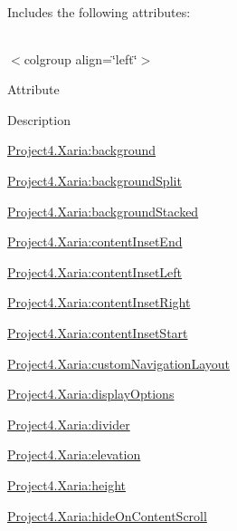 Includes the following attributes\+:

\tabulinesep=1mm
\begin{longtabu} spread 0pt [c]{*{0}{|X[-1]}|}
\hline
\end{longtabu}
$<$colgroup align=\char`\"{}left\char`\"{}$>$ 

Attribute

Description 

{\ttfamily \hyperlink{classproject4_1_1xaria_1_1R_1_1styleable_ad5297d7335b655c3a7281371b07c92d4}{Project4.\+Xaria\+:background}}

{\ttfamily \hyperlink{classproject4_1_1xaria_1_1R_1_1styleable_a0a05b0d40453638b3b59df9b162097ec}{Project4.\+Xaria\+:background\+Split}}

{\ttfamily \hyperlink{classproject4_1_1xaria_1_1R_1_1styleable_aff562ad353237ec535896356fc27af79}{Project4.\+Xaria\+:background\+Stacked}}

{\ttfamily \hyperlink{classproject4_1_1xaria_1_1R_1_1styleable_a89330126d297ac16f0e2a9dcfeaad358}{Project4.\+Xaria\+:content\+Inset\+End}}

{\ttfamily \hyperlink{classproject4_1_1xaria_1_1R_1_1styleable_a1b56e7090c35d8a347e0df70c0835624}{Project4.\+Xaria\+:content\+Inset\+Left}}

{\ttfamily \hyperlink{classproject4_1_1xaria_1_1R_1_1styleable_a214d077d9e00a3988b431a70cd90e71e}{Project4.\+Xaria\+:content\+Inset\+Right}}

{\ttfamily \hyperlink{classproject4_1_1xaria_1_1R_1_1styleable_a9212bf97d9d5252fd23d430335413682}{Project4.\+Xaria\+:content\+Inset\+Start}}

{\ttfamily \hyperlink{classproject4_1_1xaria_1_1R_1_1styleable_aa80da3fcac263c12efd759fb11979cc7}{Project4.\+Xaria\+:custom\+Navigation\+Layout}}

{\ttfamily \hyperlink{classproject4_1_1xaria_1_1R_1_1styleable_a656add89aebf98d754b0482202026647}{Project4.\+Xaria\+:display\+Options}}

{\ttfamily \hyperlink{classproject4_1_1xaria_1_1R_1_1styleable_aa7f5948a8f73f6442f4be22fae96c835}{Project4.\+Xaria\+:divider}}

{\ttfamily \hyperlink{classproject4_1_1xaria_1_1R_1_1styleable_a538cdc9cda0d9026935ab8949327a1a4}{Project4.\+Xaria\+:elevation}}

{\ttfamily \hyperlink{classproject4_1_1xaria_1_1R_1_1styleable_acac776d934e00d7cc5f0250a0d027a24}{Project4.\+Xaria\+:height}}

{\ttfamily \hyperlink{classproject4_1_1xaria_1_1R_1_1styleable_a7689152e199aa4b0e5ce73fa3c45f32e}{Project4.\+Xaria\+:hide\+On\+Content\+Scroll}}

